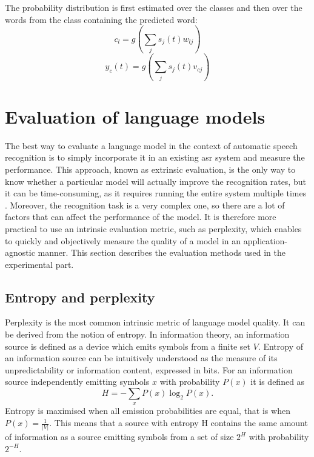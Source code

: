 	The probability distribution is first estimated over the classes and then over the words from the class containing the predicted word:
	\begin{equation}
		c_{l}=g(\sum_{j}s_{j}(t)w_{lj})
		\label{equation:classoutput}
	\end{equation}
	\begin{equation}
		y_{c}(t)=g(\sum_{j}s_{j}(t)v_{cj})
		\label{equation:wordoutput}
	\end{equation}

 	\section{Evaluation of language models}
	\label{section:evaluation}
	The best way to evaluate a language model in the context of automatic speech recognition is to simply incorporate it in an existing \gls{asr} system and measure the performance. This approach, known as extrinsic evaluation, is the only way to know whether a particular model will actually improve the recognition rates, but it can be time-consuming, as it requires running the entire system multiple times \cite{jurafsky2000speech}. Moreover, the recognition task is a very complex one, so there are a lot of factors that can affect the performance of the model. It is therefore more practical to use an intrinsic evaluation metric, such as perplexity, which enables to quickly and objectively measure the quality of a model in an application-agnostic manner. This section describes the evaluation methods used in the experimental part.
	\subsection{Entropy and perplexity}
	\label{subsection:perplexity}
	Perplexity is the most common intrinsic metric of language model quality. It can be derived from the notion of entropy. In information theory, an information source is defined as a device which emits symbols from a finite set $V$. Entropy of an information source can be intuitively understood as the measure of its unpredictability or information content, expressed in bits. For an information source independently emitting symbols $x$ with probability $P(x)$ it is defined as
	\begin{equation}
		H=-\sum_{x}P(x)\log_{2}P(x).
		\label{equation:entropy}
	\end{equation}
	Entropy is maximised when all emission probabilities are equal, that is when $P(x)=\frac{1}{|V|}$. This means that a source with entropy H contains the same amount of information as a source emitting symbols from a set of size $2^{H}$ with probability $2^{-H}$.

